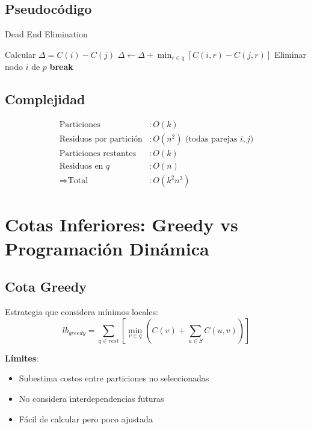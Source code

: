 \documentclass[letterpaper, 12pt]{report}
\begin{document}
\subsection{Pseudocódigo}
\begin{algorithm}[H]
\caption{Dead End Elimination}
\begin{algorithmic}[1]
            \State Calcular $\Delta = C(i) - C(j)$
                \State $\Delta \leftarrow \Delta + \min_{r \in q}[C(i,r) - C(j,r)]$
            \EndFor
                \State Eliminar nodo $i$ de $p$
                \State \textbf{break}
            \EndIf
        \EndFor
    \EndFor
\EndFor
\end{algorithmic}
\end{algorithm}


\subsection{Complejidad}

\begin{align*}
\text{Particiones} &: O(k) \\
\text{Residuos por partición} &: O(n^2) \text{ (todas parejas }i,j) \\
\text{Particiones restantes} &: O(k) \\
\text{Residuos en } q &: O(n) \\
\Rightarrow \text{Total} &: O(k^2 n^3)
\end{align*}

\section{Cotas Inferiores: Greedy vs Programación Dinámica}

\subsection{Cota Greedy}
Estrategia que considera mínimos locales:
\[
lb_{greedy} = \sum_{q \in rest} \left[ \min_{v \in q} \left( C(v) + \sum_{u \in S} C(u,v) \right) \right]
\]

\textbf{Límites}:
\begin{itemize}
\item Subestima costos entre particiones no seleccionadas
\item No considera interdependencias futuras
\item Fácil de calcular pero poco ajustada
\end{itemize}
\end{document}
